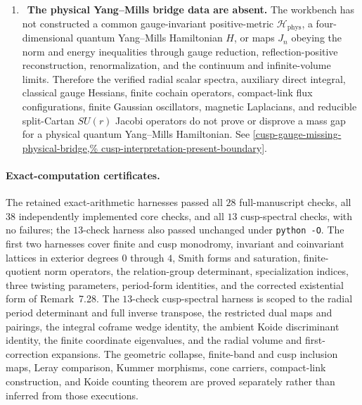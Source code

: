 \begin{enumerate}[leftmargin=1.8em,itemsep=.65em]
\item \Open\ \textbf{The physical Yang--Mills bridge data are absent.}
The workbench has not constructed a common gauge-invariant positive-metric
\(\mathcal H_{\mathrm{phys}}\), a four-dimensional quantum Yang--Mills
Hamiltonian \(H\), or maps \(J_n\) obeying the norm and energy inequalities
through gauge reduction, reflection-positive reconstruction,
renormalization, and the continuum and infinite-volume limits.  Therefore
the verified radial scalar spectra, auxiliary direct integral, classical
gauge Hessians, finite cochain operators, compact-link flux configurations,
 finite Gaussian oscillators, magnetic Laplacians, and reducible
 split-Cartan \(SU(r)\) Jacobi operators do not prove or disprove a mass gap for a physical quantum
Yang--Mills Hamiltonian.  See
\cref{cusp-gauge-missing-physical-bridge,%
cusp-interpretation-present-boundary}.

\end{enumerate}

\paragraph{Exact-computation certificates.}
The retained exact-arithmetic harnesses passed all \(28\) full-manuscript
checks, all \(38\) independently implemented core checks, and all \(13\)
cusp-spectral checks, with no failures; the \(13\)-check harness also passed
unchanged under \texttt{python -O}.  The first two harnesses cover finite and
cusp monodromy, invariant and coinvariant
lattices in exterior degrees \(0\) through \(4\), Smith forms and
saturation, finite-quotient norm operators, the relation-group determinant,
specialization indices, three twisting parameters, period-form identities,
and the corrected existential form of Remark~7.28.  The \(13\)-check
cusp-spectral harness is scoped to the radial period determinant and full
inverse transpose, the restricted dual maps and pairings, the integral
coframe wedge identity, the ambient Koide discriminant identity, the finite
coordinate eigenvalues, and the radial volume and first-correction
expansions.  The geometric collapse, finite-band and cusp inclusion maps,
Leray comparison, Kummer morphisms, cone carriers, compact-link construction,
and Koide counting theorem are proved separately rather than inferred from
those executions.

